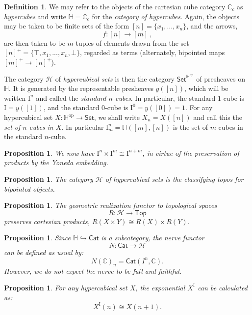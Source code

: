 \documentclass[11pt]{article}
\newcommand{\C}{\ensuremath{\mathbb{C}}}
\newcommand{\psh}[1]{\ensuremath{\mathsf{Set}^{#1^{\mathrm{op}}}}}
\newcommand{\Set}{\ensuremath{\mathsf{Set}}}
\newcommand{\Cat}{\ensuremath{\mathsf{Cat}}}
\newcommand{\hook}{\ensuremath{\hookrightarrow}}
\newcommand{\I}{\ensuremath{\mathrm{I}}}
\renewcommand{\H}{\ensuremath{\mathbb{H}}}
\newcommand{\HH}{\ensuremath{\mathcal{H}}}
\newtheorem{proposition}[theorem]{Proposition}
\theoremstyle{remark}
\theoremstyle{definition}
\newtheorem{definition}[theorem]{Definition}
\begin{document}
\begin{definition}
We may refer to the objects of the cartesian cube category $\C_c $ as \emph{hypercubes} and write $\H = \C_c$ for the \emph{category of hypercubes}.  Again, the objects may be taken to be finite sets of the form $[n] = \{x_1, ..., x_n\}$, and the arrows,
\[
f : [n] \to [m]\,,
\]
are then taken to be $m$-tuples of elements drawn from the set $[n]^+ = \{\top, x_1, ..., x_n, \bot\}$, regarded as terms (alternately, bipointed maps $[m]^+\to [n]^+$).

The category $\HH$ of \emph{hypercubical sets} is then the category  $\psh{\H}$ of presheaves on $\H$.  It is generated by the representable presheaves $y([n])$, which will be written $\I^n$ and called the \emph{standard $n$-cubes}.  In particular, the standard $1$-cube is $\I = y([1])$, and the standard $0$-cube is $\I^0 = y([0])=1$.  For any hypercubical set $X: \H^\mathrm{op} \to \Set$, we shall write $X_n = X([n])$ and call this the \emph{set of $n$-cubes in $X$}.  In particular $\I^n_m = \H([m],[n])$ is the set of $m$-cubes in the standard $n$-cube.
\end{definition}

\begin{proposition}
We now have $\I^n \times \I^m \cong \I^{n+m}$, in virtue of the preservation of products by the Yoneda embedding.
\end{proposition}


\begin{proposition}
The category $\HH$ of hypercubical sets is the classifying topos for bipointed objects.
\end{proposition}

\begin{proposition}
The geometric realization functor to topological spaces 
$$R: \HH \to \mathsf{Top}$$
preserves cartesian products, $R(X\times Y) \cong R(X)\times R(Y)$.
\end{proposition}

\begin{proposition}
Since $\H \hook  \Cat$ is a subcategory, the \emph{nerve} functor $$N : \Cat \to \HH$$ can be defined as usual by:
\[
N(\C)_n = \Cat(I^n, \C).
\]
However, we do not expect the nerve to be full and faithful.
\end{proposition}

\begin{proposition}
For any hypercubical set $X$, the exponential $X^\I$ can be calculated as:
\[
X^\I(n) \cong X(n+1).
\]
\end{proposition}
\end{document}
